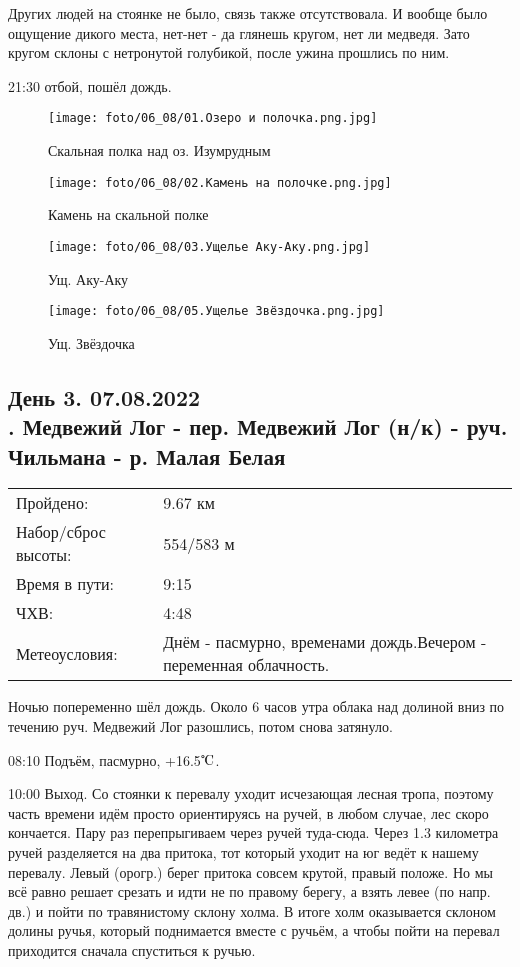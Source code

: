 Других людей на стоянке не было, связь также отсутствовала. И вообще было ощущение дикого места,
нет-нет - да глянешь кругом, нет ли медведя. Зато кругом склоны с нетронутой голубикой, после ужина прошлись по ним.

21:30 отбой, пошёл дождь.

\begin{figure}
    \centering
    \texttt{[image: foto/06\_08/01.Озеро и полочка.png.jpg]}
    \caption{Скальная полка над оз. Изумрудным}
\end{figure}

\begin{figure}
    \centering
    \texttt{[image: foto/06\_08/02.Камень на полочке.png.jpg]}
    \caption{Камень на скальной полке}
\end{figure}

\begin{figure}
    \centering
    \texttt{[image: foto/06\_08/03.Ущелье Аку-Аку.png.jpg]}
    \caption{Ущ. Аку-Аку}
\end{figure}

\begin{figure}
    \centering
    \texttt{[image: foto/06\_08/05.Ущелье Звёздочка.png.jpg]}
    \caption{Ущ. Звёздочка}
\end{figure}

\subsection{День 3. 07.08.2022\\
. Медвежий Лог - пер. Медвежий Лог (н/к) - руч. Чильмана - р. Малая Белая}
\begin{tabular}{l p{12cm}}
\hline
Пройдено: & 9.67 км\\
Набор/сброс высоты: & 554/583 м\\
Время в пути: & 9:15\\
ЧХВ: & 4:48\\
Метеоусловия: & Днём - пасмурно, временами дождь.\hfill \break Вечером - переменная облачность.\\
\hline
\end{tabular}

Ночью попеременно шёл дождь. Около 6 часов утра облака над долиной вниз по течению руч. Медвежий Лог разошлись,
потом снова затянуло.

08:10 Подъём, пасмурно, +16.5$\tccentigrade$.

10:00 Выход.
Со стоянки к перевалу уходит исчезающая лесная тропа, поэтому часть времени идём просто ориентируясь на ручей,
в любом случае, лес скоро кончается. Пару раз перепрыгиваем через ручей туда-сюда.
Через 1.3 километра ручей разделяется на два притока, тот который уходит на юг ведёт к нашему перевалу.
Левый (орогр.) берег притока совсем крутой, правый положе. Но мы всё равно решает срезать и идти не по правому берегу,
а взять левее (по напр. дв.) и  пойти по травянистому склону холма. В итоге холм оказывается склоном долины ручья,
который поднимается вместе с ручьём, а чтобы пойти на перевал приходится сначала спуститься к ручью.

